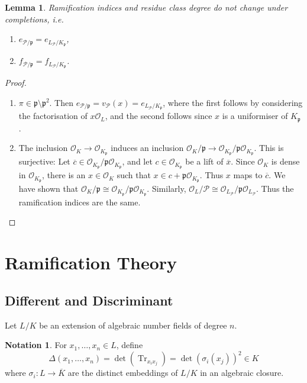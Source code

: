 \documentclass[11pt]{article}
\theoremstyle{definition}
\newtheorem*{notation}{Notation}
\theoremstyle{plain}
\newtheorem*{lemma*}{Lemma}
\theoremstyle{remark}
\DeclareMathOperator{\Tr}{Tr}
\newcommand{\cO}{\mathcal{O}}
\newcommand{\cP}{\mathcal{P}}
\newcommand{\fp}{\mathfrak{p}}
\begin{document}
\begin{lemma*}
    Ramification indices and residue class degree do not change under completions, i.e.
    \begin{enumerate}
        \item $e_{\cP / \fp} = e_{L_\cP / K_\fp}$,
        \item $f_{\cP / \fp} = f_{L_\cP / K_\fp}$.
    \end{enumerate}
\end{lemma*}
\begin{proof}\phantom{}
    \begin{enumerate}
        \item $\pi \in \fp \setminus \fp^2$. Then $e_{\cP / \fp} =v_\cP(x) = e_{L_\cP / K_\fp}$, where the first follows by considering the factorisation of $x \cO_L$, and the second follows since $x$ is a uniformiser of $K_\fp$.

        \item The inclusion $\cO_K \to \cO_{K_\fp}$ induces an inclusion $\cO_K / \fp \to \cO_{K_\fp} / \fp \cO_{K_\fp}$. This is surjective: Let $\overline{c} \in \cO_{K_\fp} / \fp\cO_{K_\fp}$, and let $c \in \cO_{K_\fp}$ be a lift of $\overline{x}$. Since $\cO_K$ is dense in $\cO_{K_\fp}$, there is an $x \in \cO_K$ such that $x \in c + \fp \cO_{K_\fp}$. Thus $x$ maps to $\overline{c}$. We have shown that $\cO_K / \fp \cong \cO_{K_\fp} / \fp \cO_{K_\fp}$. Similarly, $\cO_L / \cP \cong \cO_{L_\cP} / \fp \cO_{L_\cP}$. Thus the ramification indices are the same. \qedhere
    \end{enumerate}
\end{proof}

\section{Ramification Theory}

\subsection{Different and Discriminant}

Let $L / K$ be an extension of algebraic number fields of degree $n$.

\begin{notation}
    For $x_1, \ldots, x_n \in L$, define
    \begin{equation*}
        \Delta(x_1, \ldots, x_n) = \det(\Tr_{x_i x_j}) = \det(\sigma_i(x_j))^2 \in K
    \end{equation*}
    where $\sigma_i : L \to \overline{K}$ are the distinct embeddings of $L/K$ in an algebraic closure.
\end{notation}
\end{document}
